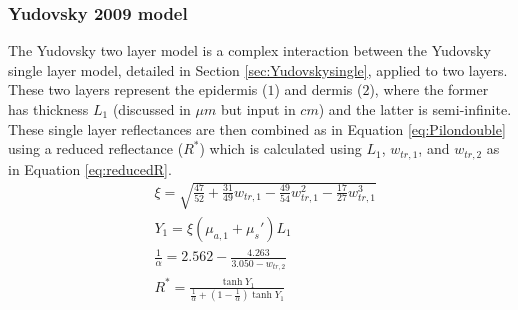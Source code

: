 \subsubsection{Yudovsky 2009 model}\label{sec:Yudovsky2009}
% 
The Yudovsky two layer model is a complex interaction between the Yudovsky single layer model, detailed in Section \ref{sec:Yudovskysingle}, applied to two layers\cite{Yudovsky2009}. These two layers represent the epidermis ($1$) and dermis ($2$), where the former has thickness $L_1$ (discussed in \textrm{$\mu m$} but input in $cm$) and the latter is semi-infinite.
These single layer reflectances are then combined as in Equation \ref{eq:Pilondouble} using a reduced reflectance ($R^*$) which is calculated using $L_1$, $w_{tr, 1}$, and $w_{tr,2}$ as in Equation \ref{eq:reducedR}. 
\begin{equation}
\begin{aligned}
    & \xi = \sqrt{\frac{47}{52} + \frac{31}{49}w_{tr, 1} - \frac{49}{54}w_{tr, 1}^2 - \frac{17}{27}w_{tr, 1}^3} \\
    & Y_1 = \xi(\mu_{a,1} + \mu_s')L_1 \\
    & \frac{1}{\alpha} = 2.562 - \frac{4.263}{3.050 - w_{tr, 2}} \\
    & R^* = \frac{\tanh{Y_1}}{\frac{1}{\alpha} + (1 - \frac{1}{\alpha})\tanh{Y_1}} \\
\end{aligned}
\label{eq:reducedR}
\end{equation}
